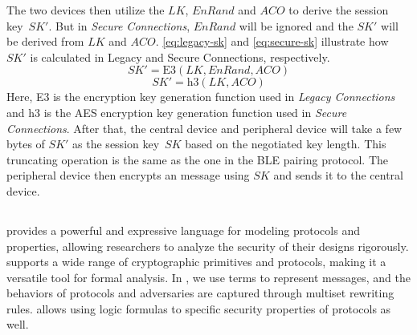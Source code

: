 \documentclass[../main.tex]{subfiles}
\begin{document}
The two devices then utilize the $LK$, $EnRand$ and $ACO$ to derive the session key~$SK'$.
But in \emph{Secure Connections}, $EnRand$ will be ignored and the $SK'$ will be derived from $LK$ and $ACO$.
\autoref{eq:legacy-sk} and \autoref{eq:secure-sk} illustrate how $SK'$ is calculated in Legacy and Secure Connections, respectively.
\begin{equation} \label{eq:legacy-sk}
    SK' = \text{E3}(LK, EnRand, ACO)
\end{equation}
\begin{equation} \label{eq:secure-sk}
    SK' = \text{h3}(LK, ACO)
\end{equation}
Here, E3 is the encryption key generation function used in \emph{Legacy Connections} and h3 is the AES encryption key generation function used in \emph{Secure Connections}.
After that, the central device and peripheral device will take a few bytes of $SK'$ as the session key~$SK$ based on the negotiated key length.
This truncating operation is the same as the one in the BLE pairing protocol.
The peripheral device then encrypts an  message using $SK$ and sends it to the central device.

\subsection{\Tamarin{}}
\Tamarin{} provides a powerful and expressive language for modeling protocols and properties, allowing researchers to analyze the security of their designs rigorously.
\Tamarin{} supports a wide range of cryptographic primitives and protocols, making it a versatile tool for formal analysis.
In \Tamarin{}, we use terms to represent messages, and the behaviors of protocols and adversaries are captured through multiset rewriting rules. 
\Tamarin{} allows using logic formulas to specific security properties of protocols as well.
\end{document}
